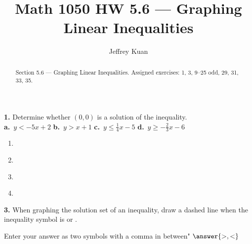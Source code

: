\documentclass{ximera}
\author{Jeffrey Kuan}
\title{Math 1050 HW 5.6 --- Graphing Linear Inequalities}
\begin{document}
\begin{abstract}
    Section 5.6 --- Graphing Linear Inequalities.
    Assigned exercises: 1, 3, 9–25 odd, 29, 31, 33, 35.
\end{abstract}

\maketitle

\begin{problem}
\textbf{1.} Determine whether $(0, 0)$ is a solution of the inequality.
  \\[2pt]
  \hspace*{1.5em}
  \textbf{a.}~$y < -5x + 2$ \qquad \textbf{b.}~$y > x + 1$ \qquad
  \textbf{c.}~$y \le \frac{1}{4}x - 5$ \qquad \textbf{d.}~$y \ge -\frac{2}{3}x - 6$

\begin{enumerate}

   \item    
   \begin{multipleChoice}
\end{multipleChoice} 

   \item    
   \begin{multipleChoice}
\end{multipleChoice} 
   
   \item  

   \begin{multipleChoice}
\end{multipleChoice}
   
   \item 

   \begin{multipleChoice}
\end{multipleChoice} 
\end{enumerate}
\end{problem}

\begin{problem}
\textbf{3.} When graphing the solution set of an inequality, draw a dashed line when the
  inequality symbol is \blank{} or \blank.

Enter your answer as two symbols with a comma in between" $\answer{>,<}$
\end{problem}
\end{document}
